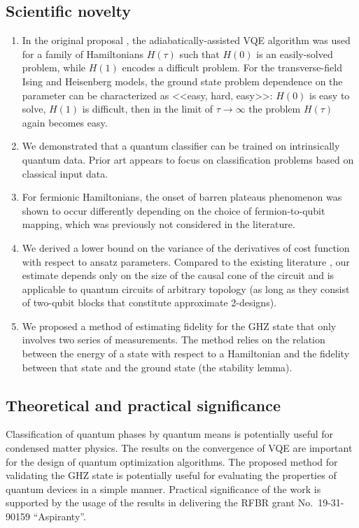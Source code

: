 \subsection*{Scientific novelty}
\begin{enumerate}
    \item In the original proposal \cite{garcia-saez_addressing_2018}, the adiabatically-assisted VQE algorithm was used for a family of Hamiltonians $H(\tau)$ such that $H(0)$ is an easily-solved problem, while $H(1)$ encodes a difficult problem. For the transverse-field Ising and Heisenberg models, the ground state problem dependence on the parameter can be characterized as <<easy, hard, easy>>: $H(0)$ is easy to solve, $H(1)$ is difficult, then in the limit of $\tau \rightarrow \infty$ the problem $H(\tau)$ again becomes easy.
    \item We demonstrated that a quantum classifier can be trained on intrinsically quantum data. Prior art appears to focus on classification problems based on classical input data.    
    \item For fermionic Hamiltonians, the onset of barren plateaus phenomenon was shown to occur differently depending on the choice of fermion-to-qubit mapping, which was previously not considered in the literature.
    \item We derived a lower bound on the variance of the derivatives of cost function with respect to ansatz parameters. Compared to the existing literature \cite{mcclean_barren_2018,cerezo_cost-function-dependent_2020}, our estimate depends only on the size of the causal cone of the circuit and is applicable to quantum circuits of arbitrary topology (as long as they consist of two-qubit blocks that constitute approximate 2-designs).
    \item We proposed a method of estimating fidelity for the GHZ state that only involves two series of measurements. The method relies on the relation between the energy of a state with respect to a Hamiltonian and the fidelity between that state and the ground state (the stability lemma).
\end{enumerate}

\subsection*{Theoretical and practical significance} Classification of quantum phases by quantum means is potentially useful for condensed matter physics. The results on the convergence of VQE are important for the design of quantum optimization algorithms. The proposed method for validating the GHZ state is potentially useful for evaluating the properties of quantum devices in a simple manner.
Practical significance of the work is supported by the usage of the results in delivering the RFBR grant No.\ 19-31-90159 ``Aspiranty''.

